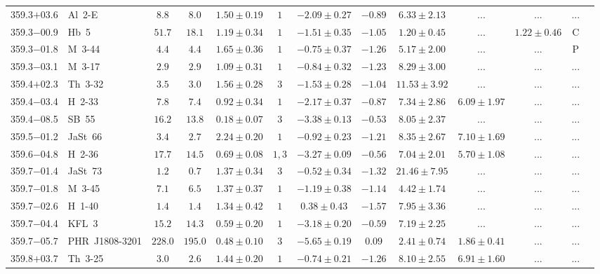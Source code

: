 \documentclass[useAMS]{mn2e}
\begin{document}
\begin{center}
{\begin{longtable}{llccccccccccc}
359.3$+$03.6&Al~2-E&$       8.8$&$       8.0$&$1.50 \pm 0.19$&$1$&$-2.09 \pm 0.27$&$     -0.89$&$6.33 \pm 2.13$&$...$&$...$&...\\
359.3$-$00.9&Hb~5&$      51.7$&$      18.1$&$1.19 \pm 0.34$&$1$&$-1.51 \pm 0.35$&$     -1.05$&$1.20 \pm 0.45$&$...$&$1.22 \pm 0.46$&C\\
359.3$-$01.8&M~3-44&$       4.4$&$       4.4$&$1.65 \pm 0.36$&$1$&$-0.75 \pm 0.37$&$     -1.26$&$5.17 \pm 2.00$&$...$&$...$&P\\
359.3$-$03.1&M~3-17&$       2.9$&$       2.9$&$1.09 \pm 0.31$&$1$&$-0.84 \pm 0.32$&$     -1.23$&$8.29 \pm 3.00$&$...$&$...$&...\\
359.4$+$02.3&Th~3-32&$       3.5$&$       3.0$&$1.56 \pm 0.28$&$3$&$-1.53 \pm 0.28$&$     -1.04$&$11.53 \pm 3.92$&$...$&$...$&...\\
359.4$-$03.4&H~2-33&$       7.8$&$       7.4$&$0.92 \pm 0.34$&$1$&$-2.17 \pm 0.37$&$     -0.87$&$7.34 \pm 2.86$&$6.09 \pm 1.97$&$...$&...\\
359.4$-$08.5&SB~55&$      16.2$&$      13.8$&$0.18 \pm 0.07$&$3$&$-3.38 \pm 0.13$&$     -0.53$&$8.05 \pm 2.37$&$...$&$...$&...\\
359.5$-$01.2&JaSt~66&$       3.4$&$       2.7$&$2.24 \pm 0.20$&$1$&$-0.92 \pm 0.23$&$     -1.21$&$8.35 \pm 2.67$&$7.10 \pm 1.69$&$...$&...\\
359.6$-$04.8&H~2-36&$      17.7$&$      14.5$&$0.69 \pm 0.08$&$1,3$&$-3.27 \pm 0.09$&$     -0.56$&$7.04 \pm 2.01$&$5.70 \pm 1.08$&$...$&...\\
359.7$-$01.4&JaSt~73&$       1.2$&$       0.7$&$1.37 \pm 0.34$&$3$&$-0.52 \pm 0.34$&$     -1.32$&$21.46 \pm 7.95$&$...$&$...$&...\\
359.7$-$01.8&M~3-45&$       7.1$&$       6.5$&$1.37 \pm 0.37$&$1$&$-1.19 \pm 0.38$&$     -1.14$&$4.42 \pm 1.74$&$...$&$...$&...\\
359.7$-$02.6&H~1-40&$       1.4$&$       1.4$&$1.34 \pm 0.42$&$1$&$0.38 \pm 0.43$&$     -1.57$&$7.95 \pm 3.36$&$...$&$...$&...\\
359.7$-$04.4&KFL~3&$      15.2$&$      14.3$&$0.59 \pm 0.20$&$1$&$-3.18 \pm 0.20$&$     -0.59$&$7.19 \pm 2.25$&$...$&$...$&...\\
359.7$-$05.7&PHR~J1808-3201&$     228.0$&$     195.0$&$0.48 \pm 0.10$&$3$&$-5.65 \pm 0.19$&$      0.09$&$2.41 \pm 0.74$&$1.86 \pm 0.41$&$...$&...\\
359.8$+$03.7&Th~3-25&$       3.0$&$       2.6$&$1.44 \pm 0.20$&$1$&$-0.74 \pm 0.21$&$     -1.26$&$8.10 \pm 2.55$&$6.91 \pm 1.60$&$...$&...\\

\end{longtable}}
\end{center}
\end{document}
